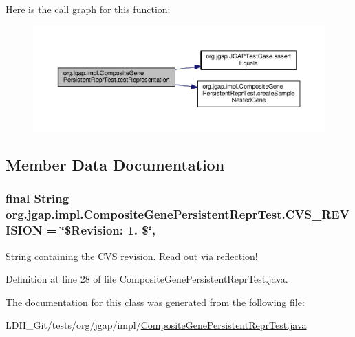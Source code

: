 Here is the call graph for this function\-:
\nopagebreak
\begin{figure}[H]
\begin{center}
\leavevmode
\includegraphics[width=350pt]{classorg_1_1jgap_1_1impl_1_1_composite_gene_persistent_repr_test_ab9a744557875163a267427c566bd68af_cgraph}
\end{center}
\end{figure}




\subsection{Member Data Documentation}
\hypertarget{classorg_1_1jgap_1_1impl_1_1_composite_gene_persistent_repr_test_a1c929856e0a0a4189f2aa4882c7f148a}{
\subsubsection[{C\-V\-S\-\_\-\-R\-E\-V\-I\-S\-I\-O\-N}]{\setlength{\rightskip}{0pt plus 5cm}final String org.\-jgap.\-impl.\-Composite\-Gene\-Persistent\-Repr\-Test.\-C\-V\-S\-\_\-\-R\-E\-V\-I\-S\-I\-O\-N = \char`\"{}\$Revision\-: 1. \$\char`\"{}\hspace{0.3cm}{\ttfamily [static]}, {\ttfamily [private]}}}\label{classorg_1_1jgap_1_1impl_1_1_composite_gene_persistent_repr_test_a1c929856e0a0a4189f2aa4882c7f148a}
String containing the C\-V\-S revision. Read out via reflection! 

Definition at line 28 of file Composite\-Gene\-Persistent\-Repr\-Test.\-java.



The documentation for this class was generated from the following file\-:\begin{DoxyCompactItemize}
\item 
L\-D\-H\-\_\-\-Git/tests/org/jgap/impl/\hyperlink{_composite_gene_persistent_repr_test_8java}{Composite\-Gene\-Persistent\-Repr\-Test.\-java}\end{DoxyCompactItemize}
